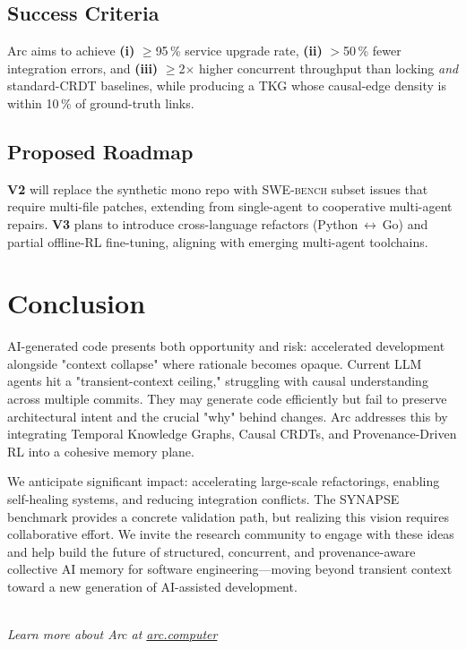 \documentclass{article}
\begin{document}
\subsection{Success Criteria}
Arc aims to achieve \textbf{(i)} $\ge$95\,\% service upgrade rate, \textbf{(ii)} $>$50\,\% fewer integration errors, and \textbf{(iii)} $\ge$2$\times$ higher concurrent throughput than locking \emph{and} standard-CRDT baselines, while producing a TKG whose causal-edge density is within 10\,\% of ground-truth links.

\subsection{Proposed Roadmap}

\textbf{V2} will replace the synthetic mono repo with  \textsc{SWE-bench} subset issues that require multi-file patches, extending from single-agent to cooperative multi-agent repairs. \textbf{V3} plans to introduce cross-language refactors (Python $\leftrightarrow$ Go) and partial offline-RL fine-tuning, aligning with emerging multi-agent toolchains.

\section{Conclusion}
AI-generated code presents both opportunity and risk: accelerated development alongside "context collapse" where rationale becomes opaque. Current LLM agents hit a "transient-context ceiling," struggling with causal understanding across multiple commits. They may generate code efficiently but fail to preserve architectural intent and the crucial "why" behind changes. Arc addresses this by integrating Temporal Knowledge Graphs, Causal CRDTs, and Provenance-Driven RL into a cohesive memory plane.

We anticipate significant impact: accelerating large-scale refactorings, enabling self-healing systems, and reducing integration conflicts. The SYNAPSE benchmark provides a concrete validation path, but realizing this vision requires collaborative effort. We invite the research community to engage with these ideas and help build the future of structured, concurrent, and provenance-aware collective AI memory for software engineering—moving beyond transient context toward a new generation of AI-assisted development.




\clearpage


\vspace{1cm}
\begin{center}
\\ \vspace{0.3cm}
\textit{Learn more about Arc at \href{https://arc.computer}{arc.computer}}
\end{center}
\end{document}
